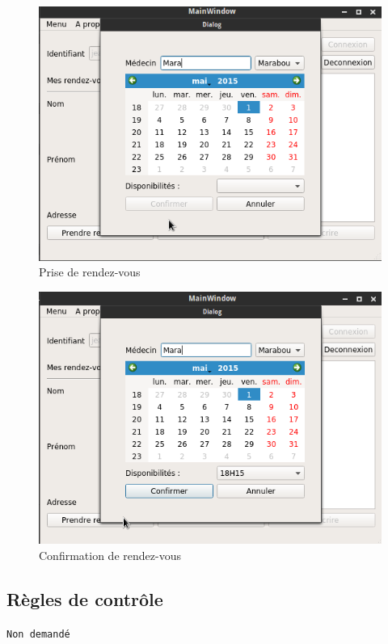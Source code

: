 \begin{figure}[hb]
	\centering
	\includegraphics[scale=0.4]{MCT/GUI/rdv.png}
	\caption{Prise de rendez-vous}
	\label{fig:rdv}
\end{figure}
\begin{figure}[hb]
	\centering
	\includegraphics[scale=0.4]{MCT/GUI/rdvConfirm.png}
	\caption{Confirmation de rendez-vous}
	\label{fig:rdvConfirm}
\end{figure}
\newpage
\subsection{Règles de contrôle}
\texttt{Non demandé}

